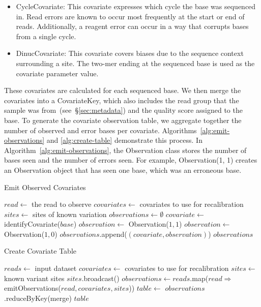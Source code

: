 \documentclass[phd]{ucbthesis}
\begin{document}
\begin{itemize}
\item {CycleCovariate}: This covariate expresses which cycle the base was
  sequenced in. Read errors are known to occur most frequently at the start or
  end of reads. Additionally, a reagent error can occur in a way that corrupts
  bases from a single cycle.
\item {DinucCovariate}: This covariate covers biases due to the sequence
  context surrounding a site. The two-mer ending at the sequenced base is used
  as the covariate parameter value.
\end{itemize}

These covariates are calculated for each sequenced base. We then merge the
covariates into a {CovariateKey}, which also includes the read group
that the sample was from~(see~\S\ref{sec:metadata}) and the quality score
assigned to the base. To generate the covariate observation table, we
aggregate together the number of observed and error bases per covariate.
Algorithms~\ref{alg:emit-observations} and \ref{alg:create-table} demonstrate
this process. In Algorithm~\ref{alg:emit-observations}, the {Observation}
class stores the number of bases seen and the number of errors seen. For
example, {Observation(1, 1)} creates an {Observation} object that
has seen one base, which was an erroneous base.

\begin{algorithm}
\caption{Emit Observed Covariates}
\label{alg:emit-observations}
\begin{algorithmic}
\STATE $read \leftarrow$ the read to observe
\STATE $covariates \leftarrow$ covariates to use for recalibration
\STATE $sites \leftarrow$ sites of known variation
\STATE $observations \leftarrow \emptyset$
\STATE $covariate \leftarrow$ identifyCovariate($base$)
\STATE $observation \leftarrow$ Observation($1, 1$)
\ELSE
\STATE $observation \leftarrow$ Observation($1, 0$)
\ENDIF
\STATE $observations$.append($(covariate, observation)$)
\ENDFOR
\RETURN $observations$
\end{algorithmic}
\end{algorithm}

\begin{algorithm}
\caption{Create Covariate Table}
\label{alg:create-table}
\begin{algorithmic}
\STATE $reads \leftarrow$ input dataset
\STATE $covariates \leftarrow$ covariates to use for recalibration
\STATE $sites \leftarrow$ known variant sites
\STATE $sites$.broadcast()
\STATE $observations \leftarrow reads$.map($read \Rightarrow$ emitObservations($read, covariates, sites$))
\STATE $table \leftarrow$ $observations$.reduceByKey(merge)
\RETURN $table$
\end{algorithmic}
\end{algorithm}
\end{document}
